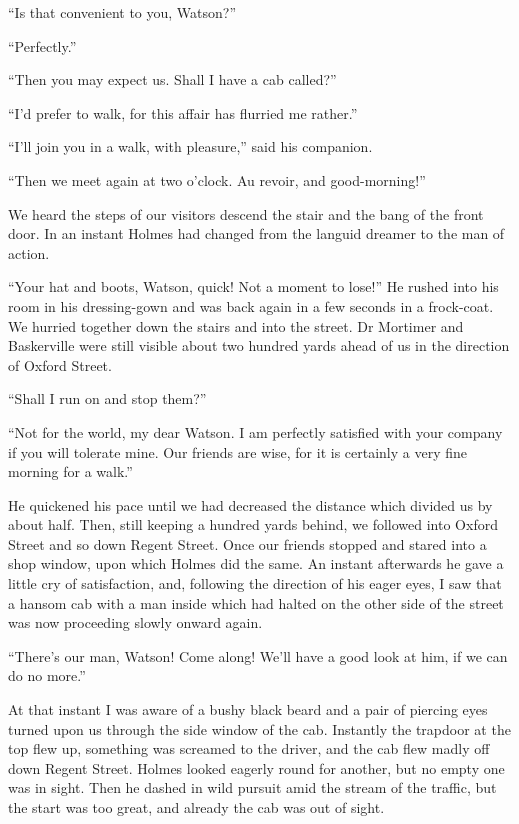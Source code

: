 \documentclass[paper=5.5in:8.5in,BCOR=7mm,twoside,DIV=calc,12pt,usegeometry,openany,chapterprefix,endperiod]{scrbook} %
\begin{document}
\enquote{Is that convenient to you, Watson?}

\enquote{Perfectly.}

\enquote{Then you may expect us. Shall I have a cab called?}

\enquote{I'd prefer to walk, for this affair has flurried me rather.}

\enquote{I'll join you in a walk, with pleasure,} said his companion.

\enquote{Then we meet again at two o'clock. Au revoir, and good-morning!}

We heard the steps of our visitors descend the stair and the bang of the front door. In an instant Holmes had changed from the languid dreamer to the man of action.

\enquote{Your hat and boots, Watson, quick! Not a moment to lose!} He rushed into his room in his dressing-gown and was back again in a few seconds in a frock-coat. We hurried together down the stairs and into the street. Dr Mortimer and Baskerville were still visible about two hundred yards ahead of us in the direction of Oxford Street.

\enquote{Shall I run on and stop them?}

\enquote{Not for the world, my dear Watson. I am perfectly satisfied with your company if you will tolerate mine. Our friends are wise, for it is certainly a very fine morning for a walk.}

He quickened his pace until we had decreased the distance which divided us by about half. Then, still keeping a hundred yards behind, we followed into Oxford Street and so down Regent Street. Once our friends stopped and stared into a shop window, upon which Holmes did the same. An instant afterwards he gave a little cry of satisfaction, and, following the direction of his eager eyes, I saw that a hansom cab with a man inside which had halted on the other side of the street was now proceeding slowly onward again.

\enquote{There's our man, Watson! Come along! We'll have a good look at him, if we can do no more.}

At that instant I was aware of a bushy black beard and a pair of piercing eyes turned upon us through the side window of the cab. Instantly the trapdoor at the top flew up, something was screamed to the driver, and the cab flew madly off down Regent Street. Holmes looked eagerly round for another, but no empty one was in sight. Then he dashed in wild pursuit amid the stream of the traffic, but the start was too great, and already the cab was out of sight.
\end{document}

